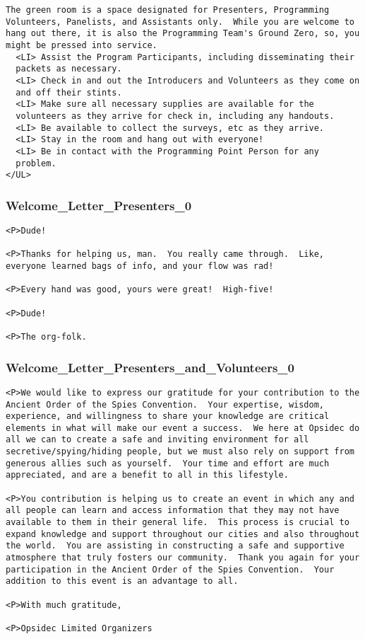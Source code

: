 \documentclass[tablesignature]{scrartcl}
\begin{document}
\begin{verbatim}
The green room is a space designated for Presenters, Programming
Volunteers, Panelists, and Assistants only.  While you are welcome to
hang out there, it is also the Programming Team's Ground Zero, so, you
might be pressed into service.
  <LI> Assist the Program Participants, including disseminating their
  packets as necessary.
  <LI> Check in and out the Introducers and Volunteers as they come on
  and off their stints.
  <LI> Make sure all necessary supplies are available for the
  volunteers as they arrive for check in, including any handouts.
  <LI> Be available to collect the surveys, etc as they arrive.
  <LI> Stay in the room and hang out with everyone!
  <LI> Be in contact with the Programming Point Person for any
  problem.
</UL>
\end{verbatim}
\subsubsection{Welcome\_{}Letter\_{}Presenters\_{}0}
\label{sec-3_5_6}

\begin{verbatim}
<P>Dude!

<P>Thanks for helping us, man.  You really came through.  Like,
everyone learned bags of info, and your flow was rad!

<P>Every hand was good, yours were great!  High-five!

<P>Dude!

<P>The org-folk.
\end{verbatim}
\subsubsection{Welcome\_{}Letter\_{}Presenters\_{}and\_{}Volunteers\_{}0}
\label{sec-3_5_7}

\begin{verbatim}
<P>We would like to express our gratitude for your contribution to the
Ancient Order of the Spies Convention.  Your expertise, wisdom,
experience, and willingness to share your knowledge are critical
elements in what will make our event a success.  We here at Opsidec do
all we can to create a safe and inviting environment for all
secretive/spying/hiding people, but we must also rely on support from
generous allies such as yourself.  Your time and effort are much
appreciated, and are a benefit to all in this lifestyle.

<P>You contribution is helping us to create an event in which any and
all people can learn and access information that they may not have
available to them in their general life.  This process is crucial to
expand knowledge and support throughout our cities and also throughout
the world.  You are assisting in constructing a safe and supportive
atmosphere that truly fosters our community.  Thank you again for your
participation in the Ancient Order of the Spies Convention.  Your
addition to this event is an advantage to all.

<P>With much gratitude,

<P>Opsidec Limited Organizers
\end{verbatim}
\end{document}
